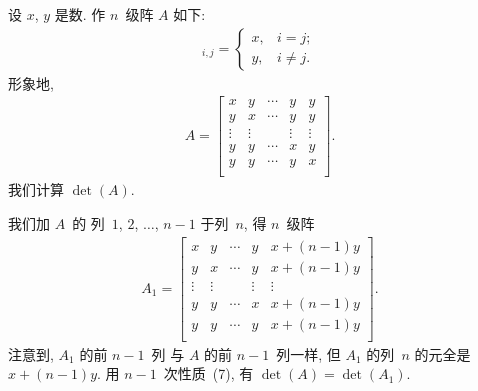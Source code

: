 \begin{example}
    设 \(x\), \(y\) 是数.
    作 \(n\)~级阵 \(A\) 如下:
    \begin{align*}
        [A]_{i,j} =
        \begin{cases}
            x, & i = j;    \\
            y, & i \neq j.
        \end{cases}
    \end{align*}
    形象地,
    \begin{align*}
        A =
        \begin{bmatrix}
            x      & y      & \cdots & y      & y      \\
            y      & x      & \cdots & y      & y      \\
            \vdots & \vdots & {}     & \vdots & \vdots \\
            y      & y      & \cdots & x      & y      \\
            y      & y      & \cdots & y      & x      \\
        \end{bmatrix}.
    \end{align*}
    我们计算 \(\det {(A)}\).

    我们加 \(A\)~的%
    列~\(1\), \(2\), \(\dots\), \(n-1\) 于列~\(n\),
    得 \(n\)~级阵
    \begin{align*}
        A_1 =
        \begin{bmatrix}
            x      & y      & \cdots & y      & x + (n-1)y \\
            y      & x      & \cdots & y      & x + (n-1)y \\
            \vdots & \vdots & {}     & \vdots & \vdots     \\
            y      & y      & \cdots & x      & x + (n-1)y \\
            y      & y      & \cdots & y      & x + (n-1)y \\
        \end{bmatrix}.
    \end{align*}
    注意到, \(A_1\) 的前 \(n-1\)~列%
    与 \(A\) 的前 \(n-1\)~列一样,
    但 \(A_1\) 的列~\(n\) 的元全是 \(x + (n-1)y\).
    用 \(n-1\)~次性质~(7), 有
    \(\det {(A)} = \det {(A_1)}\).


\end{example}
